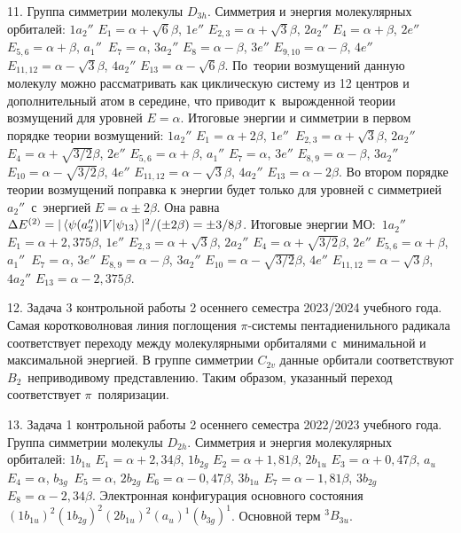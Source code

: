11. Группа симметрии молекулы $D_{3h}$. Симметрия и энергия молекулярных орбиталей: $1a_{2}''$ $E_1=\alpha+\sqrt6\beta$, $1e''$ $E_{2,3}=\alpha+\sqrt3 \beta$, $2a_{2}''$ $E_4=\alpha+\beta$, $2e''$ $E_{5,6}=\alpha+\beta$, $a_{1}''$~$E_7=\alpha$, $3a_{2}''$ $E_8=\alpha-\beta$, $3e''$ $E_{9,10}=\alpha-\beta$, $4e''$ $E_{11,12}=\alpha-\sqrt3 \beta$, $4a_{2}''$ $E_{13}=\alpha-\sqrt6 \beta$. По~теории возмущений данную молекулу можно рассматривать как циклическую систему из 12 центров и дополнительный атом в середине, что приводит к~вырожденной теории возмущений для уровней $E=\alpha$. Итоговые энергии и симметрии в первом порядке теории возмущений: $1a_{2}''$ $E_1=\alpha+2\beta$, $1e''$~$E_{2,3}=\alpha+\sqrt3 \beta$, $2a_{2}''$ $E_4=\alpha+\sqrt{3/2} \beta$, $2e''$ $E_{5,6}=\alpha+\beta$, $a_{1}''$ $E_7=\alpha$, $3e''$ $E_{8,9}=\alpha-\beta$, $3a_{2}''$ $E_{10}=\alpha-\sqrt{3/2} \beta$, $4e''$ $E_{11,12}=\alpha-\sqrt3 \beta$, $4a_{2}''$ $E_{13}=\alpha-2 \beta$. Во втором порядке теории возмущений поправка к энергии будет только для уровней с симметрией $a_2''$~с~энергией $E = \alpha \pm 2\beta$. Она равна $\Delta E^{(2)}= |\braket{\psi(a_2'')|V|\psi_{13}}|^2/(\pm 2\beta) = \pm 3/8 \beta$. Итоговые энергии МО:~$1a_{2}''$ $E_1=\alpha+2,375\beta$, $1e''$ $E_{2,3}=\alpha+\sqrt3 \beta$, $2a_{2}''$ $E_4=\alpha+\sqrt{3/2} \beta$, $2e''$ $E_{5,6}=\alpha+\beta$, $a_{1}''$~$E_7=\alpha$, $3e''$ $E_{8,9}=\alpha-\beta$, $3a_{2}''$ $E_{10}=\alpha-\sqrt{3/2} \beta$, $4e''$ $E_{11,12}=\alpha-\sqrt3 \beta$, $4a_{2}''$ $E_{13}=\alpha-2,375 \beta$.\par
12. Задача 3 контрольной работы 2 осеннего семестра 2023/2024 учебного года. Самая коротковолновая линия поглощения $\pi$-системы пентадиенильного радикала соответствует переходу между молекулярными орбиталями с~минимальной и максимальной энергией. В группе симметрии $C_{2v}$ данные орбитали соответствуют $B_2$~неприводивому представлению. Таким образом, указанный переход соответствует $\pi$~поляризации.\par
13. Задача 1 контрольной работы 2 осеннего семестра 2022/2023 учебного года. Группа симметрии молекулы $D_{2h}$. Симметрия и энергия молекулярных орбиталей: $1b_{1u}$ $E_1=\alpha+2,34\beta$, $1b_{2g}$ $E_2=\alpha+1,81\beta$, $2b_{1u}$ $E_3=\alpha+0,47\beta$, $a_{u}$ $E_4=\alpha$, $b_{3g}$~$E_5=\alpha$, $2b_{2g}$ $E_6=\alpha-0,47\beta$, $3b_{1u}$ $E_7=\alpha-1,81\beta$, $3b_{2g}$ $E_8=\alpha-2,34\beta$. Электронная конфигурация основного состояния $(1b_{1u})^2 (1b_{2g})^2 (2b_{1u})^2 (a_u)^1 (b_{3g})^1$. Основной терм $^3B_{3u}$.\par
\newpage

